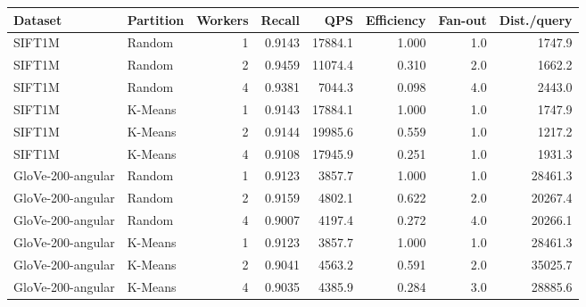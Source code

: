 \begin{tabular}{llrrrrrr}
\toprule
Dataset & Partition & Workers & Recall & QPS & Efficiency & Fan-out & Dist./query \\
\midrule
SIFT1M & Random & 1 & 0.9143 & 17884.1 & 1.000 & 1.0 & 1747.9 \\
SIFT1M & Random & 2 & 0.9459 & 11074.4 & 0.310 & 2.0 & 1662.2 \\
SIFT1M & Random & 4 & 0.9381 & 7044.3 & 0.098 & 4.0 & 2443.0 \\
SIFT1M & K-Means & 1 & 0.9143 & 17884.1 & 1.000 & 1.0 & 1747.9 \\
SIFT1M & K-Means & 2 & 0.9144 & 19985.6 & 0.559 & 1.0 & 1217.2 \\
SIFT1M & K-Means & 4 & 0.9108 & 17945.9 & 0.251 & 1.0 & 1931.3 \\
GloVe-200-angular & Random & 1 & 0.9123 & 3857.7 & 1.000 & 1.0 & 28461.3 \\
GloVe-200-angular & Random & 2 & 0.9159 & 4802.1 & 0.622 & 2.0 & 20267.4 \\
GloVe-200-angular & Random & 4 & 0.9007 & 4197.4 & 0.272 & 4.0 & 20266.1 \\
GloVe-200-angular & K-Means & 1 & 0.9123 & 3857.7 & 1.000 & 1.0 & 28461.3 \\
GloVe-200-angular & K-Means & 2 & 0.9041 & 4563.2 & 0.591 & 2.0 & 35025.7 \\
GloVe-200-angular & K-Means & 4 & 0.9035 & 4385.9 & 0.284 & 3.0 & 28885.6 \\
\bottomrule
\end{tabular}
